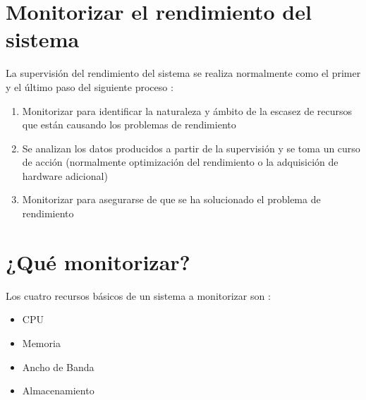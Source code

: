 \documentclass[12pt]{article}
\begin{document}
\section*{Monitorizar el rendimiento del sistema}

La supervisión del rendimiento del sistema se realiza normalmente como el primer y el último paso del siguiente proceso :

\begin{enumerate}
\item Monitorizar para identificar la naturaleza y ámbito de la escasez de recursos que están causando los problemas de rendimiento

\item Se analizan los datos producidos a partir de la supervisión y se toma un curso de acción (normalmente optimización del rendimiento o la adquisición de hardware adicional)

\item Monitorizar para asegurarse de que se ha solucionado el problema de rendimiento

\end{enumerate}

 	





\section*{¿Qué monitorizar?}

Los cuatro recursos básicos de un sistema a monitorizar son :

\begin{itemize}
\item CPU
\item Memoria
\item Ancho de Banda
\item Almacenamiento
\end{itemize}
\end{document}
